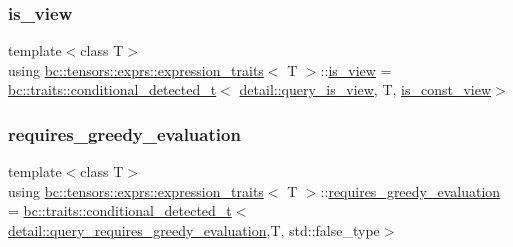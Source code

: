 \mbox{\label{structbc_1_1tensors_1_1exprs_1_1expression__traits_ab6593beaa9f6774c56756001287176d9}} 
\subsubsection{\texorpdfstring{is\+\_\+view}{is\_view}}
{\footnotesize\ttfamily template$<$class T$>$ \\
using \hyperlink{structbc_1_1tensors_1_1exprs_1_1expression__traits}{bc\+::tensors\+::exprs\+::expression\+\_\+traits}$<$ T $>$\+::\hyperlink{structbc_1_1tensors_1_1exprs_1_1expression__traits_ab6593beaa9f6774c56756001287176d9}{is\+\_\+view} =  \hyperlink{namespacebc_1_1traits_a1a6d378947ec32acd457890854bcd592}{bc\+::traits\+::conditional\+\_\+detected\+\_\+t}$<$ \hyperlink{namespacebc_1_1tensors_1_1exprs_1_1detail_a6ed62ca06012f06dc8f6143998de1e9f}{detail\+::query\+\_\+is\+\_\+view}, T, \hyperlink{structbc_1_1tensors_1_1exprs_1_1expression__traits_a9542c99877b734bea43fe8e42b3d3c04}{is\+\_\+const\+\_\+view}$>$}

\mbox{\label{structbc_1_1tensors_1_1exprs_1_1expression__traits_a0e96f494a14aad16cc6c65195fa325a6}} 
\subsubsection{\texorpdfstring{requires\+\_\+greedy\+\_\+evaluation}{requires\_greedy\_evaluation}}
{\footnotesize\ttfamily template$<$class T$>$ \\
using \hyperlink{structbc_1_1tensors_1_1exprs_1_1expression__traits}{bc\+::tensors\+::exprs\+::expression\+\_\+traits}$<$ T $>$\+::\hyperlink{structbc_1_1tensors_1_1exprs_1_1expression__traits_a0e96f494a14aad16cc6c65195fa325a6}{requires\+\_\+greedy\+\_\+evaluation} =  \hyperlink{namespacebc_1_1traits_a1a6d378947ec32acd457890854bcd592}{bc\+::traits\+::conditional\+\_\+detected\+\_\+t}$<$ \hyperlink{namespacebc_1_1tensors_1_1exprs_1_1detail_a0e9b0b3486b5ec529b2c622f14b688f9}{detail\+::query\+\_\+requires\+\_\+greedy\+\_\+evaluation},T, std\+::false\+\_\+type$>$}

